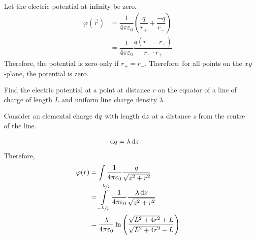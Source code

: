 \documentclass[fleqn, a4paper, 12pt, twoside]{article}
\theoremstyle{definition}
\theoremstyle{theorem}
\begin{document}
\begin{solution}
	\begin{figure}[H]
	\end{figure}
	Let the electric potential at infinity be zero.
	\begin{align*}
		\varphi \left( \overrightarrow{r} \right) &= \dfrac{1}{4 \pi \varepsilon_0} \left( \dfrac{q}{r_{+}} + \dfrac{-q}{r_{-}} \right)\\
		&= \dfrac{1}{4 \pi \varepsilon_0} \dfrac{q (r_{-} - r_{+})}{r_{-} \cdot r_{+}}
	\end{align*}
	Therefore, the potential is zero only if $r_{+} = r_{-}$.
	Therefore, for all points on the $x y$-plane, the potential is zero.
\end{solution}

\begin{question}
	Find the electric potential at a point at distance $r$ on the equator of a line of charge of length $L$ and uniform line charge density $\lambda$.
\end{question}

\begin{solution}
	Consider an elemental charge $\dif q$ with length $\dif z$ at a distance $z$ from the centre of the line.
	\begin{figure}[H]
		\begin{tikzpicture}
			
		\end{tikzpicture}
	\end{figure}
	\begin{align*}
		\dif q &= \lambda \dif z
	\end{align*}
	Therefore,
	\begin{align*}
		\varphi(r) &= \int \dfrac{1}{4 \pi \varepsilon_0} \dfrac{q}{\sqrt{z^2 + r^2}}\\
		&= \int\limits_{-\sfrac{L}{2}}^{\sfrac{L}{2}} \dfrac{1}{4 \pi \varepsilon_0} \dfrac{\lambda \dif z}{\sqrt{z^2 + r^2}}\\
		&= \dfrac{\lambda}{4 \pi \varepsilon_0} \ln \left( \dfrac{\sqrt{L^2 + 4 r^2} + L}{\sqrt{L^2 + 4 r^2} - L} \right)
	\end{align*}
\end{solution}
\end{document}
